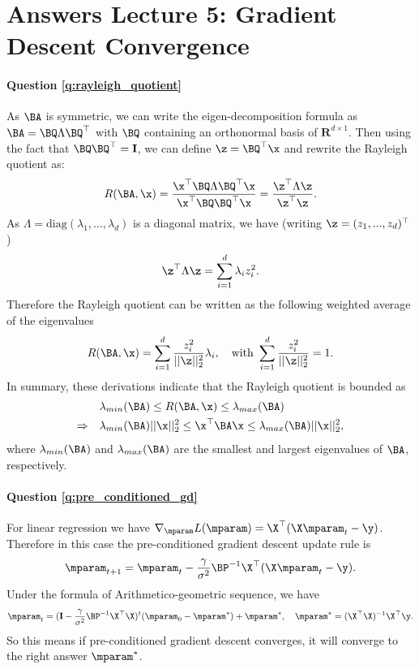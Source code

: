 \section{Answers Lecture 5: Gradient Descent Convergence}

\paragraph{Question \ref{q:rayleigh_quotient}}

As $\BA$ is symmetric, we can write the eigen-decomposition formula as $\BA = \BQ \Lambda \BQ^{\top}$ with $\BQ$ containing an orthonormal basis of $\mathbf{R}^{d\times 1}$. 
Then using the fact that $\BQ \BQ^\top = \mathbf{I}$, we can define $\z = \BQ^\top \x$ and rewrite the Rayleigh quotient as:
\begin{equation}
R(\BA, \x) = \frac{\x^\top \BQ \Lambda \BQ^\top \x}{\x^\top \BQ \BQ^\top \x} = \frac{\z^\top \Lambda \z}{\z^\top \z}.
\end{equation}
As $\Lambda = \text{diag}(\lambda_1, ..., \lambda_d)$ is a diagonal matrix, we have (writing $\z = (z_1, ..., z_d)^\top$)
\begin{equation}
    \z^\top \Lambda \z = \sum_{i=1}^d \lambda_i z_i^2.
\end{equation}
Therefore the Rayleigh quotient can be written as the following weighted average of the eigenvalues
\begin{equation}
    R(\BA, \x) = \sum_{i=1}^d \frac{z_i^2}{|| \z ||^2_2} \lambda_i, \quad \text{with } \sum_{i=1}^d \frac{z_i^2}{|| \z ||^2_2} = 1.
\end{equation}
In summary, these derivations indicate that the Rayleigh quotient is bounded as
\begin{equation}
\begin{aligned}
    &\lambda_{min}(\BA) \leq R(\BA, \x) \leq \lambda_{max}(\BA) \\
\Rightarrow \quad &\lambda_{min}(\BA) || \x ||_2^2 \leq \x^\top \BA \x \leq \lambda_{max}(\BA) || \x ||_2^2,
\end{aligned}
\end{equation}
where $\lambda_{min}(\BA)$ and $\lambda_{max}(\BA)$ are the smallest and largest eigenvalues of $\BA$, respectively.


\paragraph{Question \ref{q:pre_conditioned_gd}}
For linear regression we have $\nabla_{\mparam} L(\mparam) = \X^\top(\X \mparam_t - \y)$. Therefore in this case the pre-conditioned gradient descent update rule is
$$\mparam_{t+1} =  \mparam_t - \frac{\gamma}{\sigma^2} \BP^{-1} \X^\top(\X \mparam_t - \y).$$
%
Under the formula of Arithmetico-geometric sequence, we have
$$\mparam_{t} = (\mathbf{I} - \frac{\gamma}{\sigma^2} \BP^{-1} \X^\top \X)^t (\mparam_0 - \mparam^*) + \mparam^*, \quad \mparam^* = (\X^\top \X)^{-1} \X^\top \y.
$$
So this means if pre-conditioned gradient descent converges, it will converge to the right answer $\mparam^*$.

